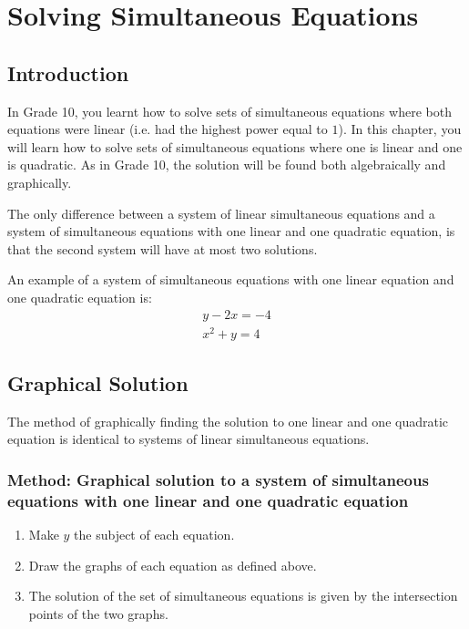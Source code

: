 \chapter{Solving Simultaneous Equations}
\label{m:se:sim11}


\section{Introduction}
In Grade 10, you learnt how to solve sets of simultaneous equations where both equations were linear (i.e.\@{} had the highest power equal to $1$). In this chapter, you will learn how to solve sets of simultaneous equations where one is linear and one is quadratic. As in Grade 10, the solution will be found both algebraically and graphically.

The only difference between a system of linear simultaneous equations and a system of simultaneous equations with one linear and one quadratic equation, is that the second system will have at most two solutions.

An example of a system of simultaneous equations with one linear equation and one quadratic equation is:
\begin{eqnarray}
\label{sim11:example}
y-2x=-4\\
x^2+y=4 \nonumber
\end{eqnarray}


\section{Graphical Solution}
The method of graphically finding the solution to one linear and one quadratic equation is identical to systems of linear simultaneous equations.

\subsection{Method: Graphical solution to a system of simultaneous equations with one linear and one quadratic equation}

\begin{enumerate}
\item{Make $y$ the subject of each equation.}
\item{Draw the graphs of each equation as defined above.}
\item{The solution of the set of simultaneous equations is given by the intersection points of the two graphs.}
\end{enumerate}


